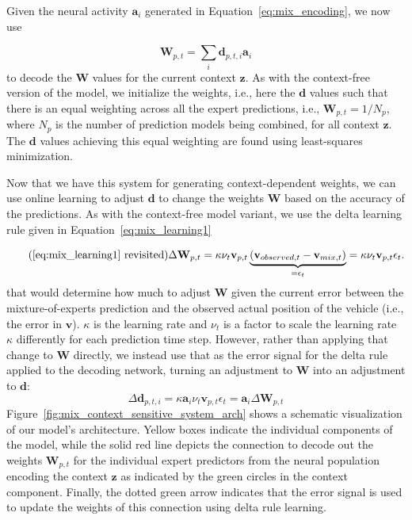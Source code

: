 Given the neural activity $\mathbf{a}_i$ generated in Equation~\eqref{eq:mix_encoding}, we now use 

\begin{equation}
  \mathbf{W}_{p,t} = \sum_{i} \mathbf{d}_{p,t,i}\mathbf{a}_i
  \label{eq:mix_decoding}
\end{equation}
to decode the $\mathbf{W}$ values for the current context $\mathbf{z}$. 
As with the context-free version of the model, we initialize the weights, i.e., here the $\mathbf{d}$ values such that there is an equal weighting across all the expert predictions, i.e., $\mathbf{W}_{p,t} = 1/N_p$, where $N_p$ is the number of prediction models being combined, for all context $\mathbf{z}$.
The $\mathbf{d}$ values achieving this equal weighting are found using least-squares minimization.

Now that we have this system for generating context-dependent weights, we can use online learning to adjust $\mathbf{d}$ to change the weights $\mathbf{W}$ based on the accuracy of the predictions. 
As with the context-free model variant, we use the delta learning rule given in Equation~\eqref{eq:mix_learning1}  

\begin{equation}
    \tag{\eqref{eq:mix_learning1} revisited}
    \Delta\mathbf{W}_{p,t} = \kappa \nu_{t} \mathbf{v}_{p,t} \underbrace{(\mathbf{v}_{observed,t}-\mathbf{v}_{mix,t})}_{=\epsilon_t} = \kappa \nu_{t} \mathbf{v}_{p,t} \epsilon_t.
\end{equation}
that would determine how much to adjust $\mathbf{W}$ given the current error between the mixture-of-experts prediction and the observed actual position of the vehicle (i.e., the error in $\mathbf{v}$).  
$\kappa$ is the learning rate and $\nu_{t}$ is a factor to scale the learning rate $\kappa$ differently for each prediction time step.
However, rather than applying that change to $\mathbf{W}$ directly, we instead use that as the error signal for the delta rule applied to the decoding network, turning an adjustment to $\mathbf{W}$ into an adjustment to $\mathbf{d}$:
\begin{equation}
\Delta\mathbf{d}_{p,t,i} = \kappa \mathbf{a}_i \nu_{t} \mathbf{v}_{p,t} \epsilon_t = \mathbf{a}_i \Delta\mathbf{W}_{p,t}
  \label{eq:learning2}
\end{equation}
Figure~\ref{fig:mix_context_sensitive_system_arch} shows a schematic visualization of our model's architecture.
Yellow boxes indicate the individual components of the model, while the solid red line depicts the connection to decode out the weights $ \mathbf{W}_{p,t}$ for the individual expert predictors from the neural population encoding the context $\mathbf{z}$ as indicated by the green circles in the context component.
Finally, the dotted green arrow indicates that the error signal is used to update the weights of this connection using delta rule learning.

